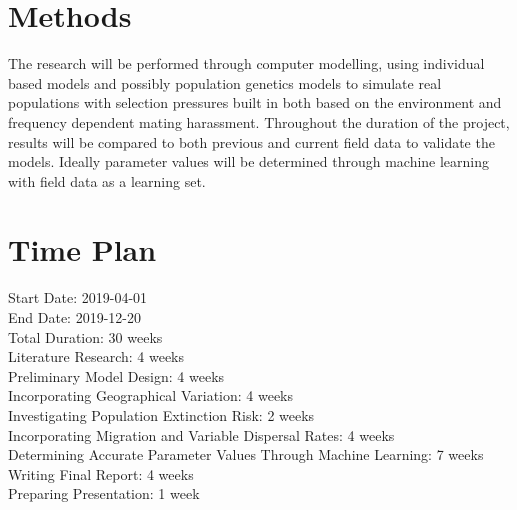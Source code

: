 \documentclass{article}
\begin{document}
\section{Methods}
The research will be performed through computer modelling, using individual based models and possibly population genetics models to simulate real populations with selection pressures built in both based on the environment and frequency dependent mating harassment. Throughout the duration of the project, results will be compared to both previous and current field data to validate the models. Ideally parameter values will be determined through machine learning with field data as a learning set.

\section{Time Plan}
Start Date: 2019-04-01\\
End Date: 2019-12-20\\
Total Duration: 30 weeks\\
Literature Research: 4 weeks\\
Preliminary Model Design: 4 weeks\\
Incorporating Geographical Variation: 4 weeks\\
Investigating Population Extinction Risk: 2 weeks\\
Incorporating Migration and Variable Dispersal Rates: 4 weeks\\
Determining Accurate Parameter Values Through Machine Learning: 7 weeks\\
Writing Final Report: 4 weeks\\
Preparing Presentation: 1 week\\

\printbibliography
\end{document}

